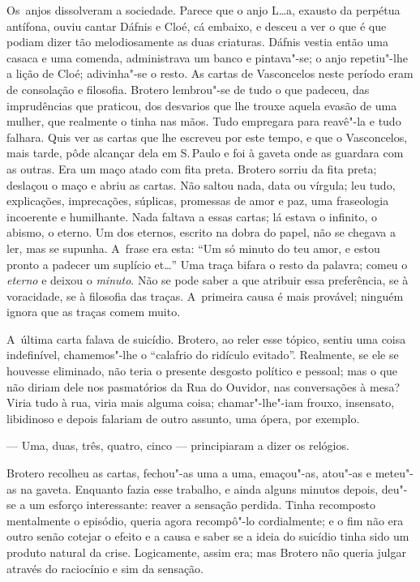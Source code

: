 \begin{linenumbers}
Os~anjos dissolveram a sociedade. Parece que o anjo L\ldots{}a, exausto da
perpétua antífona, ouviu cantar Dáfnis e Cloé, cá embaixo, e desceu a
ver o que é que podiam dizer tão melodiosamente as duas criaturas.
Dáfnis vestia então uma casaca e uma comenda, administrava um banco e
pintava"-se; o anjo repetiu"-lhe a lição de Cloé; adivinha"-se o resto. As
cartas de Vasconcelos neste período eram de consolação e filosofia.
Brotero lembrou"-se de tudo o que padeceu, das imprudências que praticou,
dos desvarios que lhe trouxe aquela evasão de uma mulher, que realmente
o tinha nas mãos. Tudo empregara para reavê"-la e tudo falhara. Quis ver
as cartas que lhe escreveu por este tempo, e que o Vasconcelos, mais
tarde, pôde alcançar dela em S.\,Paulo e foi à gaveta onde as guardara
com as outras. Era um maço atado com fita preta. Brotero sorriu da fita
preta; deslaçou o maço e abriu as cartas. Não saltou nada, data ou
vírgula; leu tudo, explicações, imprecações, súplicas, promessas de amor
e paz, uma fraseologia incoerente e humilhante. Nada faltava a essas
cartas; lá estava o infinito, o abismo, o eterno. Um dos eternos,
escrito na dobra do papel, não se chegava a ler, mas se supunha. A~frase
era esta: ``Um só minuto do teu amor, e estou pronto a padecer um
suplício et\ldots{}'' Uma traça bifara o resto da palavra; comeu o
\emph{eterno} e deixou o \emph{minuto}. Não se pode saber a que atribuir
essa preferência, se à voracidade, se à filosofia das traças. A~primeira
causa é mais provável; ninguém ignora que as traças comem muito.

A~última carta falava de suicídio. Brotero, ao reler esse tópico, sentiu
uma coisa indefinível, chamemos"-lhe o ``calafrio do ridículo evitado''.
Realmente, se ele se houvesse eliminado, não teria o presente desgosto
político e pessoal; mas o que não diriam dele nos pasmatórios da Rua do
Ouvidor, nas conversações à mesa? Viria tudo à rua, viria mais alguma
coisa; chamar"-lhe"-iam frouxo, insensato, libidinoso e depois falariam de
outro assunto, uma ópera, por exemplo.

--- Uma, duas, três, quatro, cinco --- principiaram a dizer os relógios.

Brotero recolheu as cartas, fechou"-as uma a uma, emaçou"-as, atou"-as e
meteu"-as na gaveta. Enquanto fazia esse trabalho, e ainda alguns minutos
depois, deu"-se a um esforço interessante: reaver a sensação perdida.
Tinha recomposto mentalmente o episódio, queria agora recompô"-lo
cordialmente; e o fim não era outro senão cotejar o efeito e a causa e
saber se a ideia do suicídio tinha sido um produto natural da crise.
Logicamente, assim era; mas Brotero não queria julgar através do
raciocínio e sim da sensação.


\end{linenumbers}
